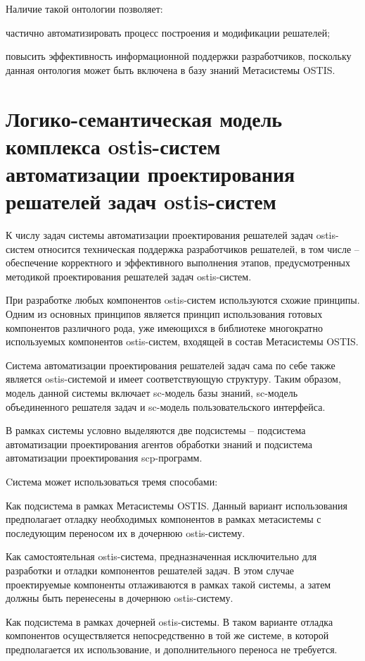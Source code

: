 Наличие такой онтологии позволяет:
\begin{textitemize}
    \item частично автоматизировать процесс построения и модификации решателей;
    \item повысить эффективность информационной поддержки разработчиков, поскольку данная онтология может быть включена в базу знаний Метасистемы OSTIS.
\end{textitemize}

\section{Логико-семантическая модель комплекса ostis-систем автоматизации проектирования решателей задач ostis-систем}

К числу задач системы автоматизации проектирования решателей задач ostis-систем относится техническая поддержка разработчиков решателей, в том числе -- обеспечение корректного и эффективного выполнения этапов, предусмотренных методикой проектирования решателей задач ostis-систем.

При разработке любых компонентов ostis-систем используются схожие принципы. Одним из основных принципов является принцип использования готовых компонентов различного рода, уже имеющихся в библиотеке многократно используемых компонентов ostis-систем, входящей в состав Метасистемы OSTIS.

Система автоматизации проектирования решателей задач сама по себе также является ostis-системой и имеет соответствующую структуру. Таким образом, модель данной системы включает sc-модель базы знаний, sc-модель объединенного решателя задач и sc-модель пользовательского интерфейса.

В рамках системы условно выделяются две подсистемы -- подсистема автоматизации проектирования агентов обработки знаний и подсистема автоматизации проектирования scp-программ.

Cистема может использоваться тремя способами:
\begin{textitemize}
    \item Как подсистема в рамках Метасистемы OSTIS. Данный вариант использования предполагает отладку необходимых компонентов в рамках метасистемы с последующим переносом их в дочернюю ostis-систему.
    \item Как самостоятельная ostis-система, предназначенная исключительно для разработки и отладки компонентов решателей задач. В этом случае проектируемые компоненты отлаживаются в рамках такой системы, а затем должны быть перенесены в дочернюю ostis-систему.
    \item Как подсистема в рамках дочерней ostis-системы. В таком варианте отладка компонентов осуществляется непосредственно в той же системе, в которой предполагается их использование, и дополнительного переноса не требуется.
\end{textitemize}

